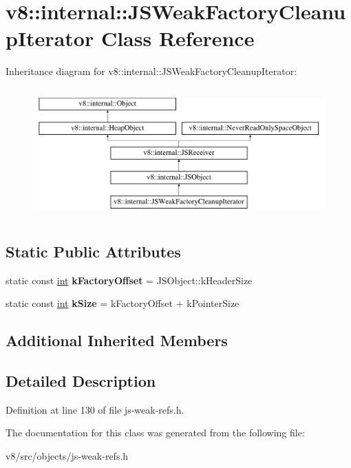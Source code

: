 \hypertarget{classv8_1_1internal_1_1JSWeakFactoryCleanupIterator}{}\section{v8\+:\+:internal\+:\+:J\+S\+Weak\+Factory\+Cleanup\+Iterator Class Reference}
\label{classv8_1_1internal_1_1JSWeakFactoryCleanupIterator}
Inheritance diagram for v8\+:\+:internal\+:\+:J\+S\+Weak\+Factory\+Cleanup\+Iterator\+:\begin{figure}[H]
\begin{center}
\leavevmode
\includegraphics[height=5.000000cm]{classv8_1_1internal_1_1JSWeakFactoryCleanupIterator}
\end{center}
\end{figure}
\subsection*{Static Public Attributes}
\begin{DoxyCompactItemize}
\item 
\mbox{\label{classv8_1_1internal_1_1JSWeakFactoryCleanupIterator_a5cd106a9f18056084975c1857f874753}} 
static const \mbox{\hyperlink{classint}{int}} {\bfseries k\+Factory\+Offset} = J\+S\+Object\+::k\+Header\+Size
\item 
\mbox{\label{classv8_1_1internal_1_1JSWeakFactoryCleanupIterator_a8ea9f96e4b637169f38665a496a5998a}} 
static const \mbox{\hyperlink{classint}{int}} {\bfseries k\+Size} = k\+Factory\+Offset + k\+Pointer\+Size
\end{DoxyCompactItemize}
\subsection*{Additional Inherited Members}


\subsection{Detailed Description}


Definition at line 130 of file js-\/weak-\/refs.\+h.



The documentation for this class was generated from the following file\+:\begin{DoxyCompactItemize}
\item 
v8/src/objects/js-\/weak-\/refs.\+h\end{DoxyCompactItemize}
